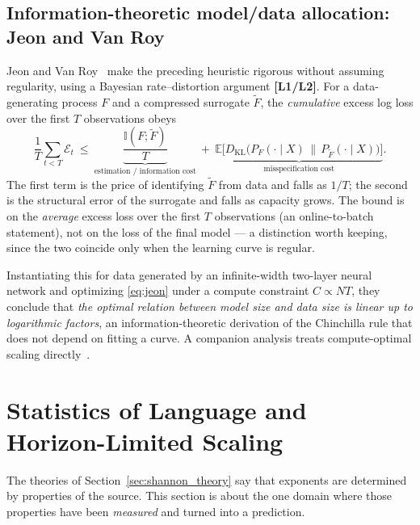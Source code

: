 \documentclass[11pt,a4paper]{article}
\theoremstyle{definition}
\begin{document}
\subsection{Information-theoretic model/data allocation: Jeon and Van Roy}

Jeon and Van Roy~\cite{jeon2024information} make the preceding heuristic rigorous without assuming regularity, using a Bayesian rate--distortion argument \textbf{[L1/L2]}. For a data-generating process $F$ and a compressed surrogate $\widetilde F$, the \emph{cumulative} excess log loss over the first $T$ observations obeys
\begin{equation}
  \frac{1}{T}\sum_{t<T}\mathcal{E}_t \ \le\ \underbrace{\frac{\mathbb{I}(F;\widetilde F)}{T}}_{\text{estimation / information cost}}
  \ +\ \underbrace{\mathbb{E}\big[D_{\mathrm{KL}}\big(P_F(\cdot\mid X)\,\|\,P_{\widetilde F}(\cdot\mid X)\big)\big]}_{\text{misspecification cost}} .
  \label{eq:jeon}
\end{equation}
The first term is the price of identifying $\widetilde F$ from data and falls as $1/T$; the second is the structural error of the surrogate and falls as capacity grows. The bound is on the \emph{average} excess loss over the first $T$ observations (an online-to-batch statement), not on the loss of the final model --- a distinction worth keeping, since the two coincide only when the learning curve is regular.

Instantiating this for data generated by an infinite-width two-layer neural network and optimizing \eqref{eq:jeon} under a compute constraint $C\propto NT$, they conclude that \emph{the optimal relation between model size and data size is linear up to logarithmic factors}, an information-theoretic derivation of the Chinchilla rule that does not depend on fitting a curve. A companion analysis treats compute-optimal scaling directly~\cite{jeon2022compute}.

\section{Statistics of Language and Horizon-Limited Scaling}
\label{sec:hilberg_and_cagnetta}

The theories of Section~\ref{sec:shannon_theory} say that exponents are determined by properties of the source. This section is about the one domain where those properties have been \emph{measured} and turned into a prediction.
\end{document}
